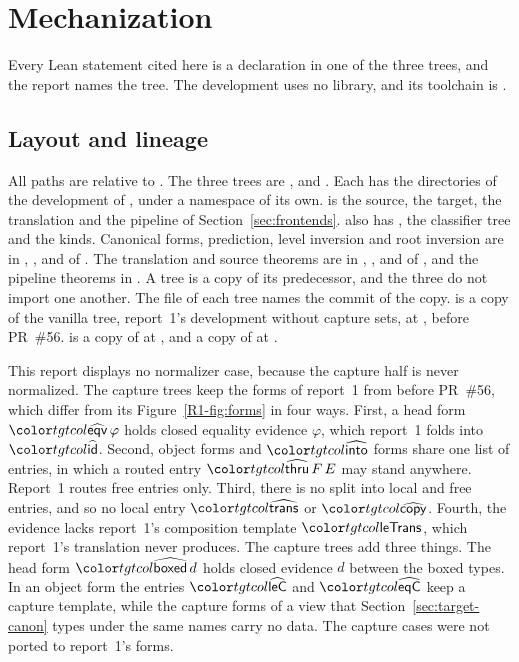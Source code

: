 \providecommand{\rg}{\raggedright\let\\\tabularnewline}
\section{Mechanization}\label{sec:mech}
\mathplain

Every Lean statement cited here is a declaration in one of the three trees, and the report names the tree. The development uses no library, and its toolchain is .

\subsection{Layout and lineage}\label{sec:mech-trees}

All paths are relative to . The three trees are ,  and . Each has the directories of the development of \Rone, under a namespace of its own.  is the source,  the target,  the translation and  the pipeline of Section~\ref{sec:frontends}. \treeCL also has , the classifier tree and the kinds. Canonical forms, prediction, level inversion and root inversion are in , ,  and  of . The translation and source theorems are in , ,  and  of , and the pipeline theorems in . A tree is a copy of its predecessor, and the three do not import one another. The file  of each tree names the commit of the copy. \treeK is a copy of the vanilla tree, report~1's development without capture sets, at , before PR~\#56. \treeCC is a copy of \treeK at , and \treeCL a copy of \treeCC at .

This report displays no normalizer case, because the capture half is never normalized. The capture trees keep the forms of report~1 from before PR~\#56, which differ from its Figure~\ref{R1-fig:forms} in four ways. First, a head form $\form{eqv}\,\varphi$ holds closed equality evidence $\varphi$, which report~1 folds into $\form{id}$. Second, object forms and $\form{into}$ forms share one list of entries, in which a routed entry $\form{thru}\,F\,E$ may stand anywhere. Report~1 routes free entries only. Third, there is no split into local and free entries, and so no local entry $\form{trans}$ or $\form{copy}$. Fourth, the evidence lacks report~1's composition template $\ev{leTrans}$, which report~1's translation never produces. The capture trees add three things. The head form $\form{boxed}\,d$ holds closed evidence $d$ between the boxed types. In an object form the entries $\form{leC}$ and $\form{eqC}$ keep a capture template, while the capture forms of a view that Section~\ref{sec:target-canon} types under the same names carry no data. The capture cases were not ported to report~1's forms.

